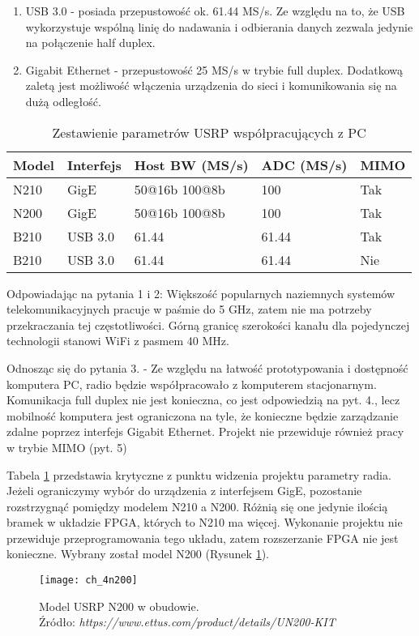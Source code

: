 \begin{enumerate}
\item USB 3.0 - posiada przepustowość ok. 61.44 MS/s.
Ze względu na to, że USB wykorzystuje wspólną linię do nadawania i odbierania danych zezwala jedynie na połączenie half duplex.
\item Gigabit Ethernet - przepustowość 25 MS/s w trybie full duplex. Dodatkową zaletą jest możliwość włączenia urządzenia do sieci i komunikowania się na dużą odległość.
\end{enumerate}

\begin{table}[t]
\caption{Zestawienie parametrów USRP współpracujących z PC}
\label{usrp_table}
\centering
\begin{tabular}{|l|l|l|l|l|}
\hline
Model & Interfejs & Host BW (MS/s) & ADC (MS/s) & MIMO \\
\hline
N210 & GigE & 50@16b 100@8b  & 100 & Tak \\
\hline
N200 & GigE & 50@16b 100@8b  & 100 & Tak \\
\hline
B210 & USB 3.0 & 61.44 & 61.44 & Tak \\
\hline
B210 & USB 3.0 & 61.44 & 61.44 & Nie \\
\hline
\end{tabular}
\end{table}


Odpowiadając na pytania 1 i 2: Większość popularnych naziemnych systemów telekomunikacyjnych pracuje w paśmie do 5 GHz, zatem nie ma potrzeby przekraczania tej częstotliwości. Górną granicę szerokości kanału dla pojedynczej technologii stanowi WiFi z pasmem 40 MHz. \cite{802.11}

Odnosząc się do pytania 3. - Ze względu na łatwość prototypowania i dostępność komputera PC, radio będzie współpracowało z komputerem stacjonarnym. Komunikacja full duplex nie jest konieczna, co jest odpowiedzią na pyt. 4., lecz mobilność komputera jest ograniczona na tyle, że konieczne będzie zarządzanie zdalne poprzez interfejs Gigabit Ethernet. Projekt nie przewiduje również pracy w trybie MIMO (pyt. 5)

Tabela \ref{usrp_table} przedstawia krytyczne z punktu widzenia projektu parametry radia. Jeżeli ograniczymy wybór do urządzenia z interfejsem GigE, pozostanie rozstrzygnąć pomiędzy modelem N210 a N200. Różnią się one jedynie ilością bramek w układzie FPGA, których to N210 ma więcej. Wykonanie projektu nie przewiduje przeprogramowania tego układu, zatem rozszerzanie FPGA nie jest konieczne. Wybrany został model N200 (Rysunek \ref{n200}).

\begin{figure}[t]
\texttt{[image: ch\_4n200]}
\centering
\caption[Model USRP N200 w obudowie.; Źródło: \textit{https://www.ettus.com/product/details/UN200-KIT}]{Model USRP N200 w obudowie. \\ Źródło: \textit{https://www.ettus.com/product/details/UN200-KIT}\endtabular}
\label{n200}
\end{figure}



        


